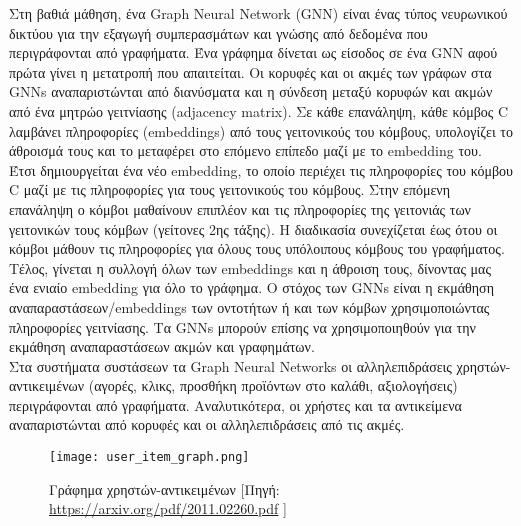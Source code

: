 Στη βαθιά μάθηση, ένα Graph Neural Network (GNN) \cite{scarselliGraphNeuralNetwork2009} είναι ένας τύπος νευρωνικού δικτύου για την εξαγωγή συμπερασμάτων και γνώσης από δεδομένα που περιγράφονται από γραφήματα. Ένα γράφημα δίνεται ως είσοδος σε ένα GNN αφού πρώτα γίνει η μετατροπή που απαιτείται. Οι κορυφές και οι ακμές των γράφων στα GNNs αναπαριστώνται από διανύσματα και η σύνδεση μεταξύ κορυφών και ακμών από ένα μητρώο γειτνίασης (adjacency matrix). Σε κάθε επανάληψη, κάθε κόμβος C λαμβάνει πληροφορίες (embeddings) από τους γειτονικούς του κόμβους, υπολογίζει το άθροισμά τους και το μεταφέρει στο επόμενο επίπεδο μαζί με το embedding του. Έτσι δημιουργείται ένα νέο embedding, το οποίο περιέχει τις πληροφορίες του κόμβου C μαζί με τις πληροφορίες για τους γειτονικούς του κόμβους. Στην επόμενη επανάληψη ο κόμβοι μαθαίνουν επιπλέον και τις πληροφορίες της γειτονιάς των γειτονικών τους κόμβων (γείτονες 2ης τάξης). Η διαδικασία συνεχίζεται έως ότου οι κόμβοι μάθουν τις πληροφορίες για όλους τους υπόλοιπους κόμβους του γραφήματος. Τέλος, γίνεται η συλλογή όλων των embeddings και η άθροιση τους, δίνοντας μας ένα ενιαίο embedding για όλο το γράφημα. Ο στόχος των GNNs είναι η εκμάθηση αναπαραστάσεων/embeddings των οντοτήτων ή και των κόμβων χρησιμοποιώντας πληροφορίες γειτνίασης. Τα GNNs μπορούν επίσης να χρησιμοποιηθούν για την εκμάθηση αναπαραστάσεων ακμών και γραφημάτων.\\
Στα συστήματα συστάσεων τα Graph Neural Networks οι αλληλεπιδράσεις χρηστών-αντικειμένων (αγορές, κλικς, προσθήκη προϊόντων στο καλάθι, αξιολογήσεις) περιγράφονται από γραφήματα. Αναλυτικότερα, οι χρήστες και τα αντικείμενα αναπαριστώνται από κορυφές και οι αλληλεπιδράσεις από τις ακμές.
\begin{figure}[!htb]
	\centering
	\texttt{[image: user\_item\_graph.png]}
	\caption[Γράφημα χρηστών-αντικειμένων]{Γράφημα χρηστών-αντικειμένων [Πηγή: \url{https://arxiv.org/pdf/2011.02260.pdf} ]}
	\label{fig:graph}
\end{figure}
\newpage
